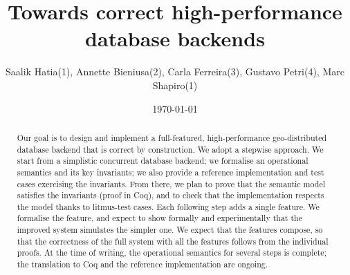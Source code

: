 \documentclass[systeme,french,english]{compas2022}
\begin{document}

\title{Towards correct high-performance database backends}

\author{Saalik Hatia(1), Annette Bieniusa(2), Carla Ferreira(3), Gustavo Petri(4), Marc Shapiro(1)}


\address{
  (1)~LIP6--Sorbonne-Université, Paris, France  \\
  (2)~TU Kaiserslautern, Germany \\
  (3)~Universidade NOVA de Lisboa, Portugal \\
  (4)~ARM, Cambridge, United Kingdom\\
  }

\date{\today}

\maketitle

\begin{abstract}
  Our goal is to design and implement a full-featured, high-performance
  geo-distributed database backend that is correct by construction.
  We adopt a stepwise approach.
  We start from a simplistic concurrent database backend; we formalise an
  operational semantics and its key invariants; we also provide a
  reference implementation and test cases exercising the invariants.
  From there, we plan to prove that the semantic model satisfies the
  invariants (proof in Coq), and to check that the implementation respects
  the model thanks to litmus-test cases.
  Each following step adds a single feature.
  We formalise the feature, and expect to show formally and experimentally
  that the improved system simulates the simpler one.
  We expect that the features compose, so that the correctness of the full
  system with all the features follows from the individual proofs.
  At the time of writing, the operational semantics for several steps is
  complete; the translation to Coq and the reference implementation are
  ongoing.

\end{abstract}

\tableofcontents

\end{document}
